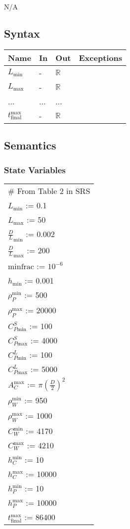 \documentclass[12pt]{article}
\begin{document}
N/A

\subsection{Syntax}

\begin{tabular}{p{3cm} p{1cm} p{1cm} >{\raggedright\arraybackslash}p{9cm}}
\toprule
\textbf{Name} & \textbf{In} & \textbf{Out} & \textbf{Exceptions} \\
\midrule
$L_{\text{min}}$ & - & $\mathbb{R}$\\
$L_{\text{max}}$ & - & $\mathbb{R}$\\
... & ... & ...\\
$t_{\text{final}}^{\text{max}}$ & - & $\mathbb{R}$\\
\bottomrule
\end{tabular}

\subsection{Semantics}

\subsubsection{State Variables}

\renewcommand{\arraystretch}{1.2}
\begin{longtable*}[l]{l} 
\# From Table 2 in SRS\\
  $L_\text{min}$ := 0.1\\
  $L_\text{max}$ := 50\\
  ${\frac{D}{L}}_\text{min}$ := 0.002 \\
  ${\frac{D}{L}}_\text{max}$ := 200 \\
  $\text{minfrac} $ := $10^{-6}$\\
  $h_\text{min}$ := 0.001 \\
  $\rho_P^{\text{min}}$ := 500\\
  $\rho_P^{\text{max}}$ := 20000\\
  $C_{P\text{min}}^S$ := 100 \\
  $C_{P\text{max}}^S$ := 4000\\
  $C_{P\text{min}}^L$ := 100 \\
  $C_{P\text{max}}^L$ := 5000\\
  $A_C^{\text{max}}$ := $\pi(\frac{D}{2})^2$\\
  $\rho_W^{\text{min}}$ := 950\\
  $\rho_W^{\text{max}}$ := 1000\\
  $C_W^{\text{min}}$ := 4170\\
  $C_W^{\text{max}}$ := 4210\\
  $h_C^{\text{min}}$ := 10\\
  $h_C^{\text{max}}$ := 10000\\
  $h_P^{\text{min}}$ := 10\\
  $h_P^{\text{max}}$ := 10000\\
  $t_{\text{final}}^{\text{max}}$ := 86400\\
\end{longtable*}
\end{document}
